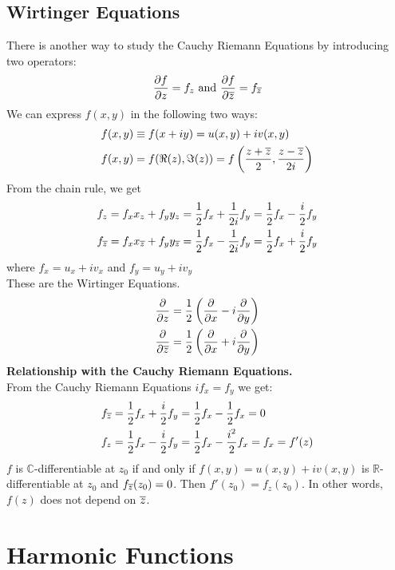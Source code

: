 \documentclass[11pt]{article}
\begin{document}
\subsection{Wirtinger Equations}
There is another way to study the Cauchy Riemann Equations by introducing two operators: 
$$\frac{\partial f}{\partial z} = f_z \text{ and } \frac{\partial f}{\partial \overline{z}} = f_{\overline{z}} $$
We can express $f(x, y)$ in the following two ways:
\begin{align*}
f(x, y) &\equiv f(x + iy) = u(x, y) + iv(x, y) \\
f(x, y) &= f(\Re(z), \Im(z)) = f\left(\frac{z + \overline{z}}{2}, \frac{z - \overline{z}}{2i}\right)
\end{align*}
From the chain rule, we get 
\begin{align*}
f_z &= f_xx_z + f_yy_z = \frac{1}{2}f_x + \frac{1}{2i}f_y = \frac{1}{2}f_x - \frac{i}{2}f_y \\
f_{\overline{z}} &= f_xx_{\overline{z}} + f_yy_{\overline{z}} = \frac{1}{2}f_x - \frac{1}{2i}f_y = \frac{1}{2}f_x + \frac{i}{2}f_y
\end{align*}
where $f_x = u_x + iv_x $ and $f_y = u_y + iv_y$ \\
These are the Wirtinger Equations. 
\begin{align*}
\frac{\partial}{\partial z} &= \frac{1}{2}\left(\frac{\partial}{\partial x} - i\frac{\partial}{\partial y}\right) \\ 
\frac{\partial}{\partial \overline{z}} &= \frac{1}{2}\left(\frac{\partial}{\partial x} + i\frac{\partial}{\partial y}\right)
\end{align*}
\newline
\textbf{Relationship with the Cauchy Riemann Equations.}\\
From the Cauchy Riemann Equations $if_x = f_y$ we get:
\begin{align*}
f_{\overline{z}} &= \frac{1}{2}f_x + \frac{i}{2}f_y = \frac{1}{2}f_x - \frac{1}{2}f_x = 0 \\
f_z &= \frac{1}{2}f_x - \frac{i}{2}f_y = \frac{1}{2}f_x - \frac{i^2}{2}f_x = f_x = f'(z)
\end{align*}
$f$ is $\mathbb{C}$-differentiable at $z_0$ if and only if $f(x, y) = u(x, y) + iv(x, y)$ is $\mathbb{R}$-differentiable at $z_0$ and $f_{\overline{z}}(z_0) = 0$. Then $f'(z_0) = f_z(z_0)$. In other words, $f(z)$ does not depend on $\overline{z}$. 

\newpage
\section{Harmonic Functions}
\end{document}
